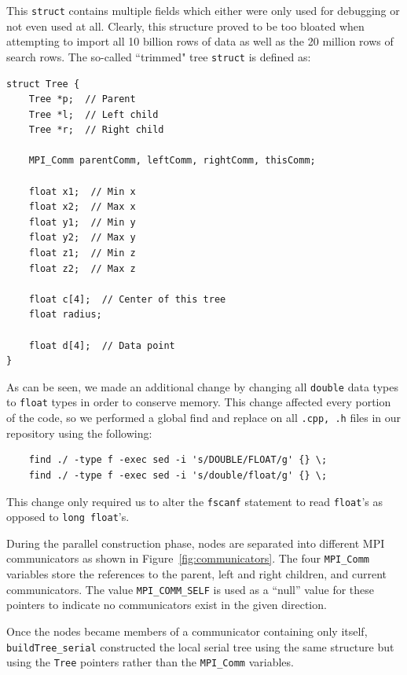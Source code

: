 \documentclass{article}
\begin{document}
This \texttt{struct} contains multiple fields which either were only used for debugging or not even used at all. Clearly, this structure proved to be too bloated when attempting to import all 10 billion rows of data as well as the 20 million rows of search rows. The so-called ``trimmed" tree \texttt{struct} is defined as:

\begin{minipage}{\linewidth}
\lstset{language=C++, keepspaces=true}
\begin{lstlisting}
struct Tree {
	Tree *p;  // Parent
	Tree *l;  // Left child
	Tree *r;  // Right child

	MPI_Comm parentComm, leftComm, rightComm, thisComm;

	float x1;  // Min x
	float x2;  // Max x
	float y1;  // Min y
	float y2;  // Max y
	float z1;  // Min z
	float z2;  // Max z

	float c[4];  // Center of this tree
	float radius;

	float d[4];  // Data point
}
\end{lstlisting}
\end{minipage}

As can be seen, we made an additional change by changing all \texttt{double} data types to \texttt{float} types in order to conserve memory. This change affected every portion of the code, so we performed a global find and replace on all \texttt{.cpp, .h} files in our repository using the following:

\lstset{language=C++, keepspaces=true}
\begin{lstlisting}
	find ./ -type f -exec sed -i 's/DOUBLE/FLOAT/g' {} \;
	find ./ -type f -exec sed -i 's/double/float/g' {} \;
\end{lstlisting}

This change only required us to alter the \texttt{fscanf} statement to read \texttt{float}'s as opposed to \texttt{long float}'s.

During the parallel construction phase, nodes are separated into different MPI communicators as shown in Figure~\ref{fig:communicators}. The four \texttt{MPI\_Comm} variables store the references to the parent, left and right children, and current communicators. The value \texttt{MPI\_COMM\_SELF} is used as a ``null'' value for these pointers to indicate no communicators exist in the given direction.

Once the nodes became members of a communicator containing only itself, \texttt{buildTree\_serial} constructed the local serial tree using the same structure but using the \texttt{Tree} pointers rather than the \texttt{MPI\_Comm} variables.
\end{document}
